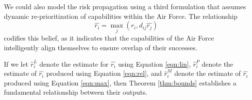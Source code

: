 \documentclass{article}
\begin{document}
We could also model the risk propagation using a third formulation that assumes dynamic re-prioritization of capabilities within the Air Force. The relationship
\begin{equation}
\label{eqn:max}
\hat{r_i} = \max_j \left(r_i, d_{ij}\hat{r_j}\right)
\end{equation}
codifies this belief, as it indicates that the capabilities of the Air Force intelligently align themselves to ensure overlap of their successes. 

If we let $\hat{r}_i^L$ denote the estimate for $\hat{r_i}$ using Equation \ref{eqn:lin},  $\hat{r}_i^P$ denote the estimate of $\hat{r_i}$ produced using Equation \ref{eqn:rel}, and $\hat{r}_i^M$ denote the estimate of $\hat{r_i}$ produced using Equation \ref{eqn:max}, then Theorem \ref{thm:bounds} establishes a fundamental relationship between their outputs.
\end{document}
